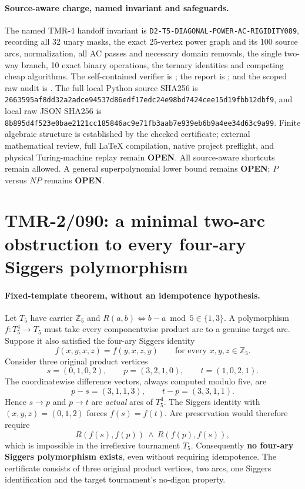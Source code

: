 \documentclass[11pt]{article}
\begin{document}
\paragraph{Source-aware charge, named invariant and safeguards.}
The named TMR-4 handoff invariant is
\texttt{D2-T5-DIAGONAL-POWER-AC-RIGIDITY089}, recording all
32 unary masks, the exact 25-vertex power graph and its 100
source arcs, normalization, all AC passes and necessary
domain removals, the single two-way branch, 10 exact binary
operations, the ternary identities and competing cheap algorithms.
The self-contained verifier is
;
the report is
;
and the scoped raw audit is
.
The full local Python source SHA256 is
\texttt{2663595af8dd32a2adce94537d86edf17edc24e98bd7424cee15d19fbb12dbf9},
and local raw JSON SHA256 is
\texttt{8b895d4f523e0bae2121cc185846ac9e71fb3aab7e939eb6b9a4ee34d63c9a99}.
Finite algebraic structure is established by the checked
certificate; external mathematical review, full LaTeX compilation,
native project preflight, and physical Turing-machine replay remain
\textbf{OPEN}. All source-aware shortcuts remain allowed.
A general superpolynomial lower bound remains \textbf{OPEN};
$P$ versus $NP$ remains \textbf{OPEN}.


\section{TMR-2/090: a minimal two-arc obstruction to every four-ary Siggers polymorphism}

\paragraph{Fixed-template theorem, without an idempotence hypothesis.}
Let $T_5$ have carrier $\mathbb Z_5$ and
$R(a,b)\iff b-a\bmod5\in\{1,3\}$.
A polymorphism $f:T_5^4\to T_5$ must take every
componentwise product arc to a genuine target arc.
Suppose it also satisfied the four-ary Siggers identity
\[
 f(x,y,x,z)=f(y,x,z,y)
 \qquad\text{for every }x,y,z\in\mathbb Z_5.
\]
Consider three original product vertices
\[
 s=(0,1,0,2),\qquad p=(3,2,1,0),\qquad
 t=(1,0,2,1).
\]
The coordinatewise difference vectors, always computed modulo
five, are
\[
 p-s=(3,1,1,3),\qquad t-p=(3,3,1,1).
\]
Hence $s\to p$ and $p\to t$ are \emph{actual}
arcs of $T_5^4$. The Siggers identity with
$(x,y,z)=(0,1,2)$ forces $f(s)=f(t)$.
Arc preservation would therefore require
\[
 R(f(s),f(p))\ \wedge\ R(f(p),f(s)),
\]
which is impossible in the irreflexive tournament $T_5$.
Consequently \textbf{no four-ary Siggers polymorphism exists},
even without requiring idempotence. The certificate consists of
three original product vertices, two arcs, one Siggers
identification and the target tournament's no-digon property.
\end{document}
